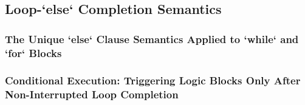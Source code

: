 \subsection{Loop-`else` Completion Semantics}
\subsubsection{The Unique `else` Clause Semantics Applied to `while` and `for` Blocks}
\subsubsection{Conditional Execution: Triggering Logic Blocks Only After Non-Interrupted Loop Completion}
